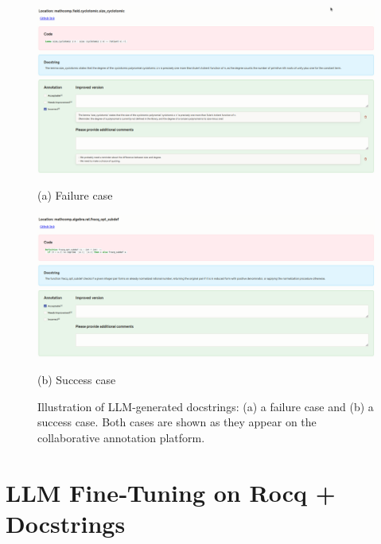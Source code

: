 \documentclass[11pt,a4paper]{article}
\begin{document}
\begin{figure}[h]
  \centering
  \begin{minipage}{0.5\textwidth}
    \centering
    \includegraphics[width=\linewidth]{fail.png}
    \captionsetup{labelformat=empty}
    \caption{(a) Failure case}
  \end{minipage}\hfill
  \begin{minipage}{0.5\textwidth}
    \centering
    \includegraphics[width=\linewidth]{success.png}
    \captionsetup{labelformat=empty}
    \caption{(b) Success case}
  \end{minipage}
  \captionsetup{labelformat=empty}
  \caption{Illustration of LLM-generated docstrings: (a) a failure case and (b) a success case. Both cases are shown as they appear on the collaborative annotation platform.}
  \label{fig:llm-examples}
\end{figure}

\section*{LLM Fine‑Tuning on Rocq + Docstrings}
\end{document}

